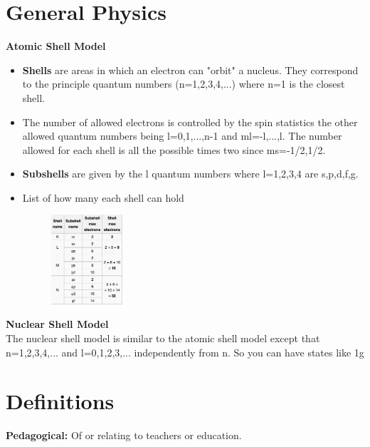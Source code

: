 \documentclass[12pt]{extarticle}
\begin{document}
\section*{General Physics}
\textbf{Atomic Shell Model}
\begin{itemize}
   \item \textbf{Shells} are areas in which an electron can "orbit" a nucleus. They correspond to the principle quantum numbers (n=1,2,3,4,...) where n=1 is the closest shell.
   \item The number of allowed electrons is controlled by the spin statistics the other allowed quantum numbers being l=0,1,...,n-1 and ml=-l,...,l. The number allowed for each shell is all the possible times two since ms=-1/2,1/2.
   \item \textbf{Subshells} are given by the l quantum numbers where l=1,2,3,4 are s,p,d,f,g.
   \item List of how many each shell can hold
   \begin{figure}[h!]
      \includegraphics[width=0.25\textwidth]{shell.png}
   \end{figure}
\end{itemize}
\textbf{Nuclear Shell Model} \\
The nuclear shell model is similar to the atomic shell model except that n=1,2,3,4,... and l=0,1,2,3,... independently from n. So you can have states like 1g

\section*{Definitions}
\textbf{Pedagogical:} Of or relating to teachers or education. \\
 
\end{document}
